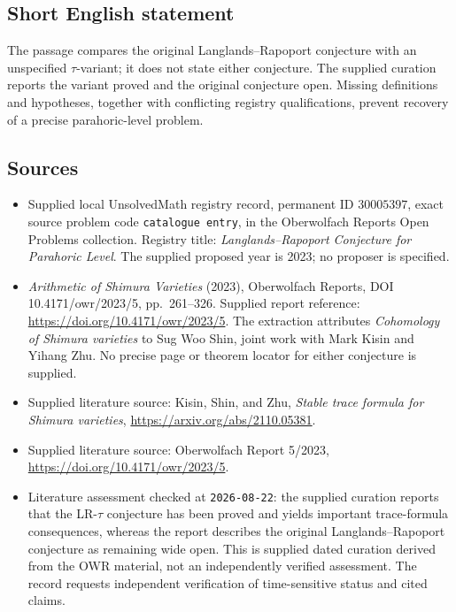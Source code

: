 \documentclass[11pt]{article}
\begin{document}
\subsection{Short English statement}
The passage compares the original Langlands--Rapoport conjecture with an unspecified \(\tau\)-variant; it does not state either conjecture. The supplied curation reports the variant proved and the original conjecture open. Missing definitions and hypotheses, together with conflicting registry qualifications, prevent recovery of a precise parahoric-level problem.
\subsection{Sources}
\begin{itemize}
\item Supplied local UnsolvedMath registry record, permanent ID \(30005397\), exact source problem code \texttt{catalogue entry}, in the Oberwolfach Reports Open Problems collection. Registry title: \emph{Langlands--Rapoport Conjecture for Parahoric Level}. The supplied proposed year is 2023; no proposer is specified.
\item \emph{Arithmetic of Shimura Varieties} (2023), Oberwolfach Reports, DOI 10.4171/owr/2023/5, pp.~261--326. Supplied report reference: \url{https://doi.org/10.4171/owr/2023/5}. The extraction attributes \emph{Cohomology of Shimura varieties} to Sug Woo Shin, joint work with Mark Kisin and Yihang Zhu. No precise page or theorem locator for either conjecture is supplied.
\item Supplied literature source: Kisin, Shin, and Zhu, \emph{Stable trace formula for Shimura varieties}, \url{https://arxiv.org/abs/2110.05381}.
\item Supplied literature source: Oberwolfach Report 5/2023, \url{https://doi.org/10.4171/owr/2023/5}.
\item Literature assessment checked at \texttt{2026-08-22}: the supplied curation reports that the LR-\(\tau\) conjecture has been proved and yields important trace-formula consequences, whereas the report describes the original Langlands--Rapoport conjecture as remaining wide open. This is supplied dated curation derived from the OWR material, not an independently verified assessment. The record requests independent verification of time-sensitive status and cited claims.
\end{itemize}
\end{document}
